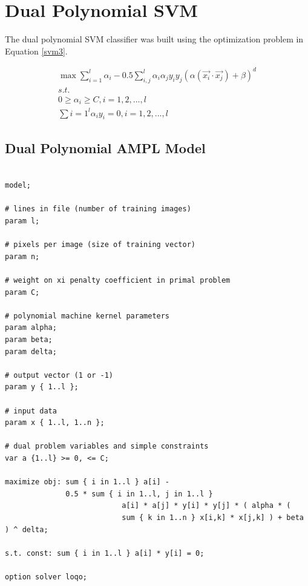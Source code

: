 \documentclass{article}
\begin{document}
\section{Dual Polynomial SVM}\label{model3}

The dual polynomial SVM classifier was built using the optimization problem in Equation \ref{svm3}.

\begin{equation}
\begin{split}
\max \sum_{i=1}^l \alpha_i - 0.5 \sum_{i,j}^l \alpha_i \alpha_j y_i y_j \left( \alpha \left( \vec{x_i} \cdot \vec{x_j} \right) + \beta \right)^d \\
s.t. \\
0 \ge \alpha_i \ge C , i = 1,2,...,l \\
\sum{i=1}^l \alpha_i y_i = 0 , i = 1,2,...,l
\end{split}
\label{svm3}
\end{equation}

\subsection{Dual Polynomial AMPL Model}

\begin{verbatim}

model;

# lines in file (number of training images)
param l;

# pixels per image (size of training vector)
param n;

# weight on xi penalty coefficient in primal problem
param C;

# polynomial machine kernel parameters
param alpha;
param beta;
param delta;

# output vector (1 or -1)
param y { 1..l };

# input data
param x { 1..l, 1..n };

# dual problem variables and simple constraints
var a {1..l} >= 0, <= C;

maximize obj: sum { i in 1..l } a[i] -
              0.5 * sum { i in 1..l, j in 1..l }
                           a[i] * a[j] * y[i] * y[j] * ( alpha * (
                           sum { k in 1..n } x[i,k] * x[j,k] ) + beta ) ^ delta;

s.t. const: sum { i in 1..l } a[i] * y[i] = 0;

option solver loqo;

\end{verbatim}
\end{document}
